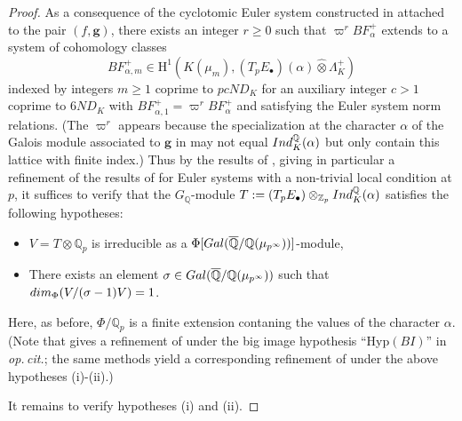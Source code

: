 \documentclass[a4paper,10pt]{amsart}
\numberwithin{equation}{section}
\numberwithin{equation}{section}
\theoremstyle{plain}
\theoremstyle{definition}
\theoremstyle{definition}
\theoremstyle{plain}
\theoremstyle{plain}
\theoremstyle{plain}
\theoremstyle{plain}
\newcommand{\Q}{\mathbb{Q}}
\newcommand{\Zp}{\mathbb{Z}_{p}}
\newcommand{\rH}{\mathrm{H}}
\begin{document}
\begin{proof}
As a consequence of the cyclotomic Euler system constructed in \cite[Thm.\,8.1.3]{explicit} attached to the pair $(f,\boldsymbol{g})$, there exists an integer $r\ge 0$ such that $\varpi^rBF_\alpha^+$ 
extends to a system of cohomology classes
\[
BF_{\alpha,m}^+\in\rH^1(K(\mu_m),(T_pE_\bullet)(\alpha)\widehat\otimes\Lambda_K^+)
\]
indexed by integers $m\geq 1$ coprime to $pcND_K$ for an auxiliary integer $c>1$ coprime to $6ND_K$ with $BF_{\alpha,1}^+=\varpi^rBF_\alpha^+$ and satisfying the Euler system norm relations. (The $\varpi^r$ appears because the specialization at the character $\alpha$ of the Galois module
associated to $\boldsymbol{g}$ in \cite{explicit} may not equal ${\rm Ind}_K^\Q(\alpha)$ but only contain this lattice with finite index.) 
%
Thus by the results of \cite[\S{12}]{explicit}, giving in particular a refinement of the results of \cite{rubin-ES} for Euler systems with a non-trivial local condition at $p$, it suffices to verify that the $G_\Q$-module $T:=(T_pE_\bullet)\otimes_{\Zp}{\rm Ind}_K^\Q(\alpha)$ satisfies the following hypotheses:
\begin{itemize}
\item[(i)] { $V=T\otimes\Q_p$ is irreducible as a $\Phi[{\rm Gal}(\overline{\Q}/\Q(\mu_{p^\infty}))]$-module,}
\item[(ii)] There exists an element $\sigma\in{\rm Gal}(\overline{\Q}/\Q(\mu_{p^{\infty}}))$ such that ${\rm dim}_{\Phi}(V /(\sigma-1) V)=1$.
\end{itemize}
{Here, as before, $\Phi/\Q_p$ is a finite extension contaning the values of the character $\alpha$.}
(Note that \cite[Thm.~12.3.4]{explicit} gives a refinement of \cite[Thm.~II.3.3]{rubin-ES} under the big image hypothesis ``Hyp$(BI)$'' in \emph{op.\,cit.}; the same methods yield a corresponding refinement of \cite[Thm.~II.3.4]{rubin-ES} under the above hypotheses (i)-(ii).)
{
It remains to verify hypotheses (i) and (ii).  

}
\end{proof}
\end{document}
